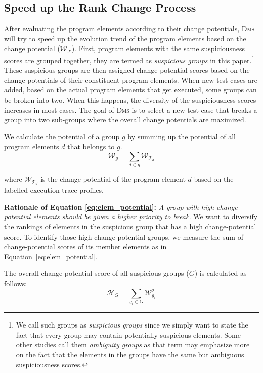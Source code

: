 \subsection{Speed up the Rank Change Process}

After evaluating the program elements according to their change potentials, \textsc{Dms} will try to speed up the evolution trend of the program elements based on the change potential ($\mathcal{W}_{\mathcal{T}}$). First, program elements with the same suspiciousness scores are grouped together, they are termed as {\em suspicious groups} in this paper.\footnote{We call such groups as {\em suspicious groups} since we simply want to state the fact that every group may contain potentially suspicious elements. Some other studies \cite[e.g.][]{Alberto2011} call them {\em ambiguity groups} as that term may emphasize more on the fact that the elements in the groups have the same but ambiguous suspiciousness scores.} These suspicious groups are then assigned change-potential scores based on the change potentials of their constituent program elements. When new test cases are added, based on the actual program elements that get executed, some groups can be broken into two. When this happens, the diversity of the suspiciousness scores increases in most cases. The goal of \textsc{Dms} is to select a new test case that breaks a group into two sub-groups where the overall change potentials are maximized.

We calculate the potential of a group $g$ by summing up the potential of all program elements $d$ that
belongs to $g$.
\begin{equation}
\label{eq:elem_potential}
	\mathcal{W}_{g} = \sum\limits_{d \in g}\mathcal{W}_{\mathcal{T}_{d}}
\end{equation}

\noindent
where $\mathcal{W}_{\mathcal{T}_d}$ is the change potential of the program element $d$ based on the labelled execution trace profiles.

\noindent\textbf{Rationale of Equation \ref{eq:elem_potential}:} \textit{A group with high change-potential elements should be given a higher priority to break.}
We want to diversify the rankings of elements in the suspicious group that has a high change-potential score.
To identify those high change-potential groups, we measure the sum of change-potential scores of its member elements as in Equation~\ref{eq:elem_potential}.

The overall change-potential score of all suspicious groups ($G$) is calculated as follows:
\begin{equation}
	\mathcal{H}_G = \sum\limits_{g_{i} \in G}{ \mathcal{W}_{g_i}^{2} }\label{eq:groupset_potential}
\end{equation}

